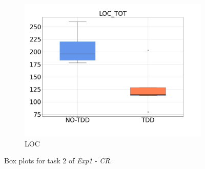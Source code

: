 \begin{figure}[H]
\begin{subfigure}{0.33\textwidth}
        \includegraphics[width=\linewidth]{figures/box_plots/task2/LOC.png}
        \caption{LOC}
        \label{bp_task2_loc}
    \end{subfigure}
    \caption{Box plots for task 2 of \textit{Exp1} - \textit{CR}.}
    \label{box_plots_task2}
\end{figure}

